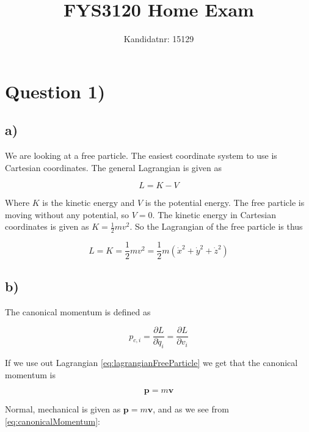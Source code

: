 \documentclass[a4paper,norsk, 10pt]{article}
\title{FYS3120 Home Exam}
\author{Kandidatnr: 15129}
\begin{document}
\maketitle

\section{Question 1)}

\subsection*{a)}
We are looking at a free particle. The easiest coordinate system to use is Cartesian coordinates. The general Lagrangian is given as 

\begin{equation}
L = K - V
\label{eq:lagrangian}
\end{equation}

Where $K$ is the kinetic energy and $V$ is the potential energy. The free particle is moving without any potential, so $V = 0$. The kinetic energy in Cartesian coordinates is given as $K = \frac{1}{2}mv^2$. So the Lagrangian of the free particle is thus

\begin{equation}
L = K = \frac{1}{2}mv^2 = \frac{1}{2}m(\dot{x}^2 + \dot{y}^2 + \dot{z}^2)
\label{eq:lagrangianFreeParticle}
\end{equation}


\subsection*{b)}

The canonical momentum is defined as

\begin{equation}
p_{c,i} = \frac{\partial L}{\partial \dot{q}_i} =\frac{\partial L}{\partial v_i} 
\end{equation}

If we use out Lagrangian \eqref{eq:lagrangianFreeParticle} we get that the canonical momentum is 

\begin{equation}
\mathbf{p} = m\mathbf{v}
\label{eq:canonicalMomentum}
\end{equation}

Normal, mechanical is given as $\mathbf{p} = m\mathbf{v}$, and as we see from \eqref{eq:canonicalMomentum}:
\end{document}
